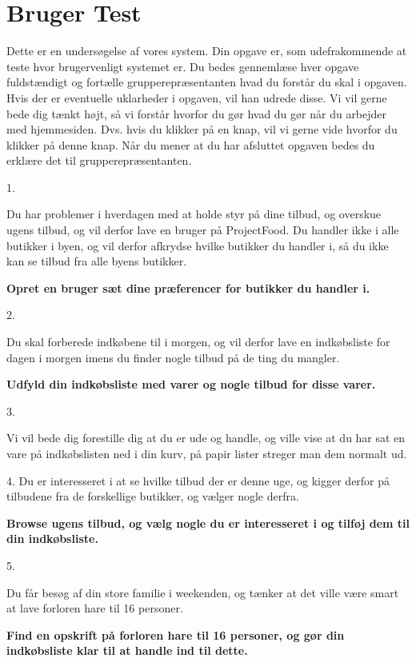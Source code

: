 \chapter{Bruger Test}

Dette er en undersøgelse af vores system. Din opgave er, som udefrakommende at teste hvor brugervenligt systemet er. Du bedes gennemlæse hver opgave fuldstændigt og fortælle grupperepræsentanten hvad du forstår du skal i opgaven. Hvis der er eventuelle uklarheder i opgaven, vil han udrede disse. Vi vil gerne bede dig tænkt højt, så vi forstår hvorfor du gør hvad du gør når du arbejder med hjemmesiden. Dvs. hvis du klikker på en knap, vil vi gerne vide hvorfor du klikker på denne knap. Når du mener at du har afsluttet opgaven bedes du erklære det til grupperepræsentanten.

1.

Du har problemer i hverdagen med at holde styr på dine tilbud, og overskue ugens tilbud, og vil derfor lave en bruger på ProjectFood.
Du handler ikke i alle butikker i byen, og vil derfor afkrydse hvilke butikker du handler i, så du ikke kan se tilbud fra alle byens butikker.

\textbf{Opret en bruger sæt dine præferencer for butikker du handler i. }

2.

Du skal forberede indkøbene til i morgen, og vil derfor lave en indkøbsliste for dagen i morgen imens du finder nogle tilbud på de ting du mangler.

\textbf{Udfyld din indkøbsliste med varer og nogle tilbud for disse varer.}

3.

Vi vil bede dig forestille dig at du er ude og handle, og ville vise at du har sat en vare på indkøbslisten ned i din kurv, på papir lister streger man dem normalt ud.

4.
Du er interesseret i at se hvilke tilbud der er denne uge, og kigger derfor på tilbudene fra de forskellige butikker, og vælger nogle derfra.

\textbf{Browse ugens tilbud, og vælg nogle du er interesseret i og tilføj dem til din indkøbsliste.}

5.

Du får besøg af din store familie i weekenden, og tænker at det ville være smart at lave forloren hare til 16 personer.

\textbf{Find en opskrift på forloren hare til 16 personer, og gør din indkøbsliste klar til at handle ind til dette.}

